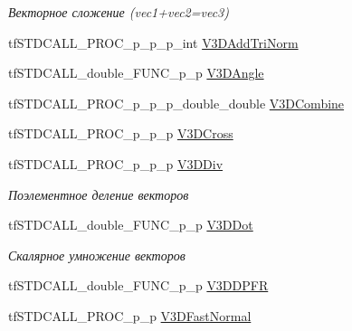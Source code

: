 \begin{DoxyCompactItemize}
\begin{DoxyCompactList}\small\item\em Векторное сложение (vec1+vec2=vec3) \end{DoxyCompactList}\item 
tf\-S\-T\-D\-C\-A\-L\-L\-\_\-\-P\-R\-O\-C\-\_\-p\-\_\-p\-\_\-p\-\_\-int \hyperlink{structs_functions_vector_c_p_u_a25b657c2ec00cf538750a3b5d3514624}{V3\-D\-Add\-Tri\-Norm}
\item 
tf\-S\-T\-D\-C\-A\-L\-L\-\_\-double\-\_\-\-F\-U\-N\-C\-\_\-p\-\_\-p \hyperlink{structs_functions_vector_c_p_u_a5169cea6d597f0a6b5799f7c26e657ee}{V3\-D\-Angle}
\item 
tf\-S\-T\-D\-C\-A\-L\-L\-\_\-\-P\-R\-O\-C\-\_\-p\-\_\-p\-\_\-p\-\_\-double\-\_\-double \hyperlink{structs_functions_vector_c_p_u_a1aad46855b54bfe308b5b62f6834553f}{V3\-D\-Combine}
\item 
tf\-S\-T\-D\-C\-A\-L\-L\-\_\-\-P\-R\-O\-C\-\_\-p\-\_\-p\-\_\-p \hyperlink{structs_functions_vector_c_p_u_a5f700a18b138afc2b00821930a7291c1}{V3\-D\-Cross}
\item 
\hypertarget{structs_functions_vector_c_p_u_ac701a9fa1074108d17a56dd94eb0848d}{tf\-S\-T\-D\-C\-A\-L\-L\-\_\-\-P\-R\-O\-C\-\_\-p\-\_\-p\-\_\-p \hyperlink{structs_functions_vector_c_p_u_ac701a9fa1074108d17a56dd94eb0848d}{V3\-D\-Div}}\label{structs_functions_vector_c_p_u_ac701a9fa1074108d17a56dd94eb0848d}

\begin{DoxyCompactList}\small\item\em Поэлементное деление векторов \end{DoxyCompactList}\item 
\hypertarget{structs_functions_vector_c_p_u_aee68bc0c9512b6919fe583ccc8496686}{tf\-S\-T\-D\-C\-A\-L\-L\-\_\-double\-\_\-\-F\-U\-N\-C\-\_\-p\-\_\-p \hyperlink{structs_functions_vector_c_p_u_aee68bc0c9512b6919fe583ccc8496686}{V3\-D\-Dot}}\label{structs_functions_vector_c_p_u_aee68bc0c9512b6919fe583ccc8496686}

\begin{DoxyCompactList}\small\item\em Скалярное умножение векторов \end{DoxyCompactList}\item 
tf\-S\-T\-D\-C\-A\-L\-L\-\_\-double\-\_\-\-F\-U\-N\-C\-\_\-p\-\_\-p \hyperlink{structs_functions_vector_c_p_u_a5bfef7fc73ca39902a1313e0ba451f59}{V3\-D\-D\-P\-F\-R}
\item 
\hypertarget{structs_functions_vector_c_p_u_a98a3255df8e3ce870edb1cd96e05f4d3}{tf\-S\-T\-D\-C\-A\-L\-L\-\_\-\-P\-R\-O\-C\-\_\-p\-\_\-p \hyperlink{structs_functions_vector_c_p_u_a98a3255df8e3ce870edb1cd96e05f4d3}{V3\-D\-Fast\-Normal}}\label{structs_functions_vector_c_p_u_a98a3255df8e3ce870edb1cd96e05f4d3}


\end{DoxyCompactItemize}
